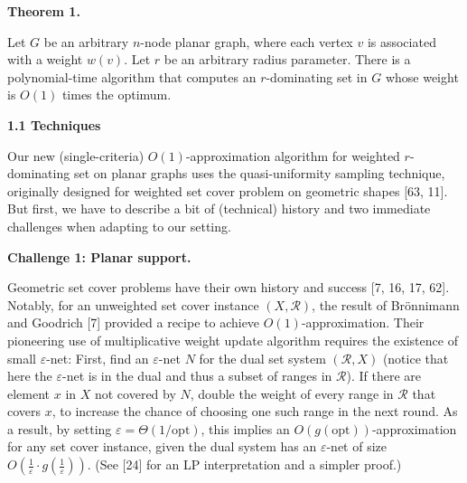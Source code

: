 \documentclass[10pt,a4paper]{article}
\begin{document}
\par\medskip\noindent\textbf{Theorem 1.}\par
Let $G$ be an arbitrary $n$-node planar graph, where each vertex $v$ is associated with a weight $w(v)$. Let $r$ be an arbitrary radius parameter. There is a polynomial-time algorithm that computes an $r$-dominating set in $G$ whose weight is $O(1)$ times the optimum.
\par
\par
\par

\par\medskip\noindent\textbf{1.1 Techniques}\par
Our new (single-criteria) $O(1)$-approximation algorithm for weighted $r$-dominating set on planar graphs uses the quasi-uniformity sampling technique, originally designed for weighted set cover problem on geometric shapes [63, 11]. But first, we have to describe a bit of (technical) history and two immediate challenges when adapting to our setting.
\par
\par
\par\medskip\noindent\textbf{Challenge 1: Planar support.}\par
Geometric set cover problems have their own history and success [7, 16, 17, 62]. Notably, for an unweighted set cover instance $(X,\mathcal{R})$, the result of Brönnimann and Goodrich [7] provided a recipe to achieve $O(1)$-approximation. Their pioneering use of multiplicative weight update algorithm requires the existence of small $\varepsilon$-net: First, find an $\varepsilon$-net $N$ for the dual set system $(\mathcal{R},X)$ (notice that here the $\varepsilon$-net is in the dual and thus a subset of ranges in $\mathcal{R}$). If there are element $x$ in $X$ not covered by $N$, double the weight of every range in $\mathcal{R}$ that covers $x$, to increase the chance of choosing one such range in the next round. As a result, by setting $\varepsilon=\Theta(1/\mathrm{opt})$, this implies an $O(g(\mathrm{opt}))$-approximation for any set cover instance, given the dual system has an $\varepsilon$-net of size $O(\frac{1}{\varepsilon}\cdot g(\frac{1}{\varepsilon}))$. (See [24] for an LP interpretation and a simpler proof.)
\par
\par
\end{document}
